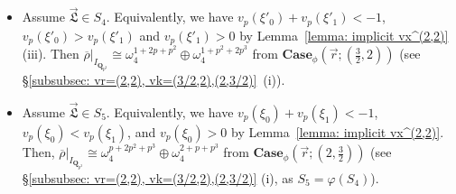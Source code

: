 \documentclass[11pt]{amsart}
\theoremstyle{definition}
\numberwithin{equation}{subsection}
\theoremstyle{plain}
\theoremstyle{plain}
\theoremstyle{plain}
\theoremstyle{plain}
\theoremstyle{plain}
\theoremstyle{plain}
\theoremstyle{plain}
\theoremstyle{plain}
\theoremstyle{plain}
\theoremstyle{plain}
\theoremstyle{plain}
\theoremstyle{plain}
\theoremstyle{definition}
\theoremstyle{definition}
\theoremstyle{definition}
\theoremstyle{remark}
\renewcommand{\(}{\textup{(}}
\renewcommand{\)}{\textup{)}}
\newcommand{\Q}{\mathbf{Q}}
\newcommand{\rhobar}{\overline{\rho}}
\newcommand{\fL}{\mathfrak{L}}
\newcommand{\vr}{\vec{r}}
\newcommand{\vL}{\vec{\fL}}
\newcommand{\IQptwo}{{I_{\Q_{p^2}}}}
\begin{document}
\begin{itemize}[leftmargin=*]
Now we assume $\vL\in S'_3\subset S_3$. By Lemma~\ref{lemma: implicit vx^(2,2)}~(i), we have $v_p(\xi'_0)+v_p(\xi'_1)=-1$ and $-1<v_p(\xi'_0)<0$. In this case, there are another lattice giving non-split mod-$p$ reduction, which is different from the above two. For this lattice, we have $\rhobar|_\IQptwo\cong
\begin{bmatrix}
    \omega & * \\ 0 & \omega
\end{bmatrix}$, with $\vec{\mathrm{MT}}=(0,1)$ if $-1<v_p(\xi_0+1)-v_p(\xi_1+1)<0$, $\vec{\mathrm{MT}}=(1,1)$ if $v_p(\xi_0+1)=v_p(\xi_1+1)$, and $\vec{\mathrm{MT}}=(1,0)$ if $0<v_p(\xi_0+1)-v_p(\xi_1+1)<1$. This is from \S\ref{subsubsec: vr=(2,2), vk=(3/2,2),(2,3/2)}~(ii) if $v_p(\xi'_0)\neq -\frac{1}{2}$ (i.e., $v_p(\xi_0+1)\neq v_p(\xi_1+1)$ in $S'_3$), and from \S\ref{subsubsec: vr=(2,2), vk=(3/2,2),(2,3/2)}~(iii) if $v_p(\xi'_0)=-\frac{1}{2}$ (i.e., $v_p(\xi_0+1)=v_p(\xi_1+1)$ in $S'_3$).

\item Assume $\vL\in S_4$. Equivalently, we have $v_p(\xi'_0)+v_p(\xi'_1)<-1$, $v_p(\xi'_0)>v_p(\xi'_1)$ and $v_p(\xi'_1)>0$ by Lemma~\ref{lemma: implicit vx^(2,2)} (iii). Then $\rhobar|_\IQptwo\cong\omega_4^{1+2p+p^2}\oplus\omega_4^{1+p^2+2p^3}$ from $\mathbf{Case}_\phi(\vr;(\frac{3}{2},2))$ (see \S\ref{subsubsec: vr=(2,2), vk=(3/2,2),(2,3/2)}~(i)).

\item Assume $\vL\in S_5$. Equivalently, we have $v_p(\xi_0)+v_p(\xi_1)<-1$, $v_p(\xi_0)<v_p(\xi_1)$, and $v_p(\xi_0)>0$ by Lemma~\ref{lemma: implicit vx^(2,2)}. Then, $\rhobar|_\IQptwo\cong\omega_4^{p+2p^2+p^3}\oplus\omega_4^{2+p+p^3}$ from $\mathbf{Case}_\phi(\vr;(2,\frac{3}{2}))$ (see \S\ref{subsubsec: vr=(2,2), vk=(3/2,2),(2,3/2)} (i), as $S_5=\varphi(S_4)$).


\end{itemize}
\end{document}

